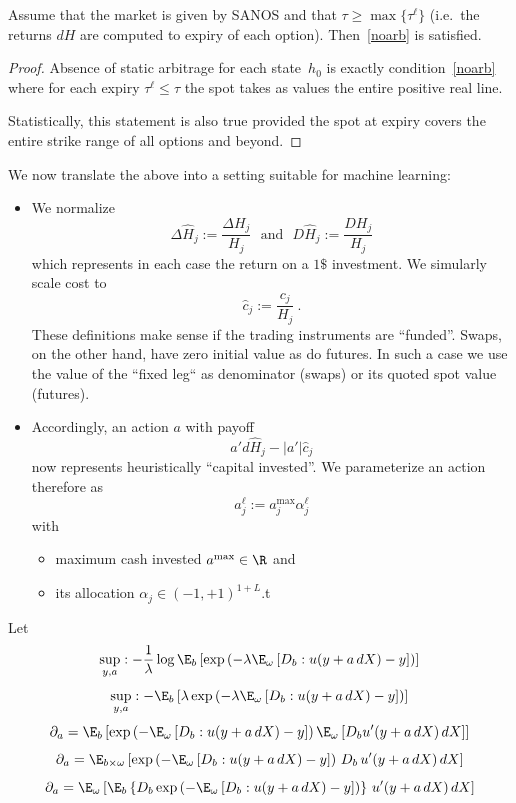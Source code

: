 \documentclass{hbarticle}
\begin{document}
    \begin{prop}[SANOS]
        Assume that the market is given by SANOS and that $\tau\geq\max\{\tau^\ell\}$ (i.e.~the returns $dH$
        are computed to expiry of each option). Then~\eqref{noarb} is satisfied.
    \end{prop}

    \begin{proof}
        Absence of static arbitrage for each state~$h_0$ is exactly condition~\eqref{noarb}
        where for each expiry $\tau^\ell\leq \tau$ the spot takes as values the entire
        positive real line.
        
        Statistically, this statement is also true
        provided the spot at expiry covers the entire strike range of all options and beyond.        
    \end{proof}

	\noindent	
	We now translate the above into a setting suitable for machine
	learning:
	\begin{itemize}
		\item
			We normalize
			$$
				\Delta \hat H_j := \frac{ \Delta H_j }{ H_j } 
				\ \ \ \mbox{and} \ \ \ 
				D \hat H_j := \frac{ D H_j }{ H_j } 
			$$
			which represents in each case the return on a $1\$$
			investment.
			We simularly scale cost to
			$$
				\hat c_j := \frac{ c_j }{ H_j }\ .
			$$
			These definitions make sense if the trading instruments are ``funded''. 
			Swaps, on the other hand, have zero initial value as do futures. In such a case we use the value of the ``fixed leg`` 
			as denominator (swaps) or its quoted spot value (futures).
		\item
			Accordingly, an action $a$ with payoff 
			$$
				a' d\hat H_j - |a'|\hat c_j 
			$$
			now represents heuristically ``capital invested''.
			We parameterize an action therefore as
			$$
				a_j^\ell := a^{\max}_j \alpha^\ell_j
			$$
			with
			\begin{itemize}
				\item maximum cash invested $a^{\max}\in\R$ and
				\item its allocation $\alpha_j \in (-1,+1)^{1+L}$.t
			\end{itemize}
	\end{itemize}



	\pagebreak    
    
    Let
    $$
    		\sup_{y,a} : - \frac1\lambda\log  \E_b\left[ \exp\left( - \lambda \E_\omega\left[ D_b: u(y + a\,dX) - y \right] \right) \right]
	$$
    $$
    		\sup_{y,a} : - \E_b\left[ \lambda \exp\left( - \lambda \E_\omega\left[ D_b: u(y + a\,dX) - y\right] \right) \right]
	$$
	$$
		\partial_a = \E_b\left[ \exp\left( - \E_\omega\left[ D_b: u(y + a\,dX) - y\right] \right) \E_\omega\left[ D_b u'(y + a\,dX)\,dX \right] \right]
	$$
	$$
		\partial_a = \E_{b\times\omega} \left[ \exp\left( - \E_\omega\left[ D_b: u(y + a\,dX) - y\right] \right)\, D_b\,u'(y + a\,dX)\,dX  \right]
	$$
	$$
		\partial_a = \E_{\omega} \left[ \E_b\left\{ D_b 
					\exp\left( - \E_\omega\left[D_b: u(y + a\,dX) - y\right] \right)\right\}\, u'(y + a\,dX)\,dX  \right]
	$$
    
\end{document}
